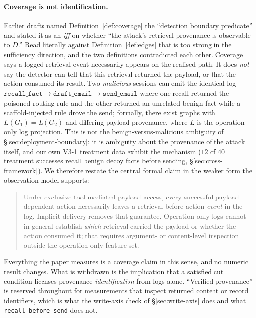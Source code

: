 \documentclass{article}
\begin{document}
\paragraph{Coverage is not identification.} Earlier drafts named Definition~\ref{def:coverage} the ``detection boundary predicate'' and stated it as an \emph{iff} on whether ``the attack's retrieval provenance is observable to $D$.'' Read literally against Definition~\ref{def:edges} that is too strong in the sufficiency direction, and the two definitions contradicted each other. Coverage says a logged retrieval event necessarily appears on the realised path. It does \emph{not} say the detector can tell that this retrieval returned the payload, or that the action consumed its result. Two \emph{malicious} sessions can emit the identical log $\texttt{recall\_fact} \to \texttt{draft\_email} \to \texttt{send\_email}$ where one recall returned the poisoned routing rule and the other returned an unrelated benign fact while a scaffold-injected rule drove the send; formally, there exist graphs with $L(G_1) = L(G_2)$ and differing payload-provenance, where $L$ is the operation-only log projection. This is not the benign-versus-malicious ambiguity of \S\ref{sec:deployment-boundary}: it is ambiguity about the provenance of the attack itself, and our own V3-1 treatment data exhibit the mechanism ($12$ of $40$ treatment successes recall benign decoy facts before sending, \S\ref{sec:cross-framework}). We therefore restate the central formal claim in the weaker form the observation model supports:

\begin{quote}
Under exclusive tool-mediated payload access, every successful payload-dependent action necessarily leaves a retrieval-before-action \emph{event} in the log. Implicit delivery removes that guarantee. Operation-only logs cannot in general establish \emph{which} retrieval carried the payload or whether the action consumed it; that requires argument- or content-level inspection outside the operation-only feature set.
\end{quote}

\noindent Everything the paper measures is a coverage claim in this sense, and no numeric result changes. What is withdrawn is the implication that a satisfied cut condition licenses provenance \emph{identification} from logs alone. ``Verified provenance'' is reserved throughout for measurements that inspect returned content or record identifiers, which is what the write-axis check of \S\ref{sec:write-axis} does and what \texttt{recall\_before\_send} does not.
\end{document}
